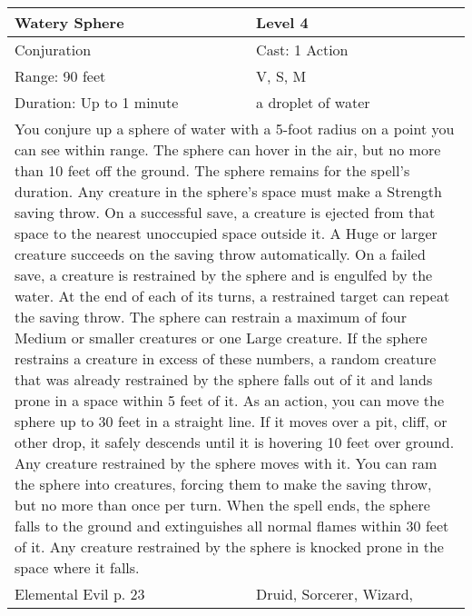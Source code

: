 \documentclass[11pt]{report}
\begin{document}
\begin{table}[H]
	\begin{tabular}{||p{6cm}|p{6cm}||}
		\hline\hline
		\bf{Watery Sphere} & Level 4\\ \hline
		Conjuration & Cast: 1 Action\\ \hline
		Range: 90 feet & V, S, M\\ \hline
		Duration: Up to 1 minute & a droplet of water\\ \hline
		\multicolumn{2}{||p{12cm}||}{You conjure up a sphere of water with a 5-foot radius on a point you can see within range. The sphere can hover in the air, but no more than 10 feet off the ground. The sphere remains for the spell’s duration.
Any creature in the sphere’s space must make a Strength saving throw. On a successful save, a creature is ejected from that space to the nearest unoccupied space outside it. A Huge or larger creature succeeds on the saving throw automatically. On a failed save, a creature is restrained by the sphere and is engulfed by the water. At the end of each of its turns, a restrained target can repeat the saving throw.
The sphere can restrain a maximum of four Medium or smaller creatures or one Large creature. If the sphere restrains a creature in excess of these numbers, a random creature that was already restrained by the sphere falls out of it and lands prone in a space within 5 feet of it.
As an action, you can move the sphere up to 30 feet in a straight line. If it moves over a pit, cliff, or other drop, it safely descends until it is hovering 10 feet over ground. Any creature restrained by the sphere moves with it. You can ram the sphere into creatures, forcing them to make the saving throw, but no more than once per turn.
When the spell ends, the sphere falls to the ground and extinguishes all normal flames within 30 feet of it. Any creature restrained by the sphere is knocked prone in the space where it falls.}\\ \hline
Elemental Evil p. 23 & Druid, Sorcerer, Wizard, \\ \hline\hline
	\end{tabular}
\end{table}
\end{document}
